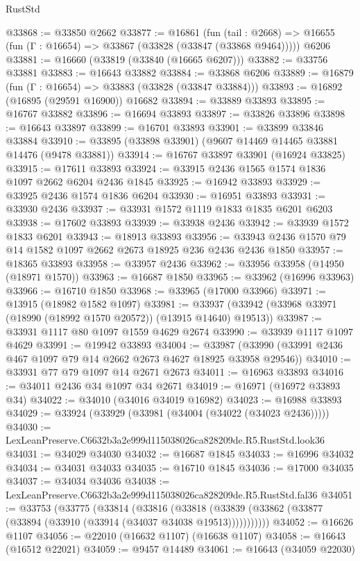 \begin{lexlean}{RustStd}
\begin{coremodule}
@33868 := @33850 @2662
@33877 := @16861
    (fun (tail : @2668) => @16655 (fun (Γ : @16654) => @33867 (@33828 (@33847 (@33868 @9464)))))
    @6206
@33881 := @16660 (@33819 (@33840 (@16665 @6207)))
@33882 := @33756 @33881
@33883 := @16643 @33882
@33884 := @33868 @6206
@33889 := @16879 (fun (Γ : @16654) => @33883 (@33828 (@33847 @33884)))
@33893 := @16892 (@16895 (@29591 @16900)) @16682
@33894 := @33889 @33893
@33895 := @16767 @33882
@33896 := @16694 @33893
@33897 := @33826 @33896
@33898 := @16643 @33897
@33899 := @16701 @33893
@33901 := @33899 @33846 @33884
@33910 := @33895 (@33898 @33901) (@9607 @14469 @14465 @33881 @14476 (@9478 @33881))
@33914 := @16767 @33897 @33901 (@16924 @33825)
@33915 := @17611 @33893
@33924 := @33915 @2436 @1565 @1574 @1836 @1097 @2662 @6204 @2436 @1845
@33925 := @16942 @33893
@33929 := @33925 @2436 @1574 @1836 @6204
@33930 := @16951 @33893
@33931 := @33930 @2436
@33937 := @33931 @1572 @1119 @1833 @1835 @6201 @6203
@33938 := @17602 @33893
@33939 := @33938 @2436
@33942 := @33939 @1572 @1833 @6201
@33943 := @18913 @33893
@33956 := @33943 @2436 @1570 @79 @14 @1582 @1097 @2662 @2673 @18925 @236 @2436 @2436 @1850
@33957 := @18365 @33893
@33958 := @33957 @2436
@33962 := @33956 @33958 (@14950 (@18971 @1570))
@33963 := @16687 @1850
@33965 := @33962 (@16996 @33963)
@33966 := @16710 @1850
@33968 := @33965 (@17000 @33966)
@33971 := @13915 (@18982 @1582 @1097)
@33981 := @33937 (@33942 (@33968 @33971 (@18990 (@18992 @1570 @20572)) (@13915 @14640) @19513))
@33987 := @33931 @1117 @80 @1097 @1559 @4629 @2674
@33990 := @33939 @1117 @1097 @4629
@33991 := @19942 @33893
@34004 := @33987 (@33990 (@33991 @2436 @467 @1097 @79 @14 @2662 @2673 @4627 @18925 @33958 @29546))
@34010 := @33931 @77 @79 @1097 @14 @2671 @2673
@34011 := @16963 @33893
@34016 := @34011 @2436 @34 @1097 @34 @2671
@34019 := @16971 (@16972 @33893 @34)
@34022 := @34010 (@34016 @34019 @16982)
@34023 := @16988 @33893
@34029 := @33924 (@33929 (@33981 (@34004 (@34022 (@34023 @2436)))))
@34030 := LexLeanPreserve.C6632b3a2e999d115038026ca828209de.R5.RustStd.look36
@34031 := @34029 @34030
@34032 := @16687 @1845
@34033 := @16996 @34032
@34034 := @34031 @34033
@34035 := @16710 @1845
@34036 := @17000 @34035
@34037 := @34034 @34036
@34038 := LexLeanPreserve.C6632b3a2e999d115038026ca828209de.R5.RustStd.fal36
@34051 := @33753
    (@33775
      (@33814
        (@33816
          (@33818 (@33839 (@33862 (@33877 (@33894 (@33910 (@33914 (@34037 @34038 @19513)))))))))))
@34052 := @16626 @1107
@34056 := @22010 (@16632 @1107) (@16638 @1107)
@34058 := @16643 (@16512 @22021)
@34059 := @9457 @14489
@34061 := @16643 (@34059 @22030)

\end{coremodule}
\end{lexlean}
